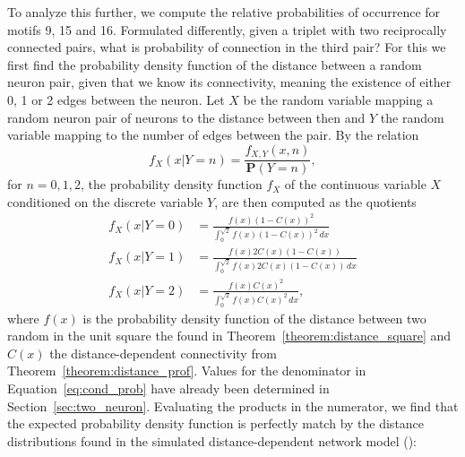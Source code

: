 To analyze this further, we compute the relative probabilities of
occurrence for motifs 9, 15 and 16. Formulated differently, given a
triplet with two reciprocally connected pairs, what is probability of
connection in the third pair? For this we first find the probability
density function of the distance between a random neuron pair, given
that we know its connectivity, meaning the existence of either 0, 1 or
2 edges between the neuron. Let $X$ be the random variable mapping a
random neuron pair of neurons to the distance between then and $Y$ the
random variable mapping to the number of edges between the pair. By
the relation
\[
f_X(x \vert Y=n) = \frac{f_{X,Y}(x,n)}{\mathbf{P}(Y=n)},
\]
for $n=0, 1, 2$, the probability density function $f_X$ of the continuous variable
$X$ conditioned on the discrete variable $Y$, are then computed as the
quotients
%
\medskip
\begin{equation}
\begin{aligned}
  f_X(x \vert Y=0)%
    & = \frac{f(x) (1-C(x))^2}%
            {\int_0^{\sqrt{2}} f(x) (1-C(x))^2 \, dx}%
     \\[1em]%
  f_X(x \vert Y=1)%
    & = \frac{f(x) 2 C(x) (1-C(x))}%
             {\int_0^{\sqrt{2}} f(x) 2 C(x) (1-C(x)) \, dx}%
      \\[1em]%
  f_X(x \vert Y=2)%
    & = \frac{f(x) C(x)^2}
             {\int_0^{\sqrt{2}} f(x) C(x)^2 \, dx},
\end{aligned}
\label{eq:cond_prob}
\end{equation}
%
where $f(x)$ is the probability density function of the distance
between two random in the unit square the found in
Theorem~\ref{theorem:distance_square} and $C(x)$ the
distance-dependent connectivity from
Theorem~\ref{theorem:distance_prof}. Values for the denominator in
Equation~\ref{eq:cond_prob} have already been determined in
Section~\ref{sec:two_neuron}. Evaluating the products in the
numerator, we find that the expected probability density function is
perfectly match by the distance distributions found in the simulated
distance-dependent network model ():

